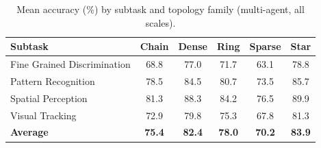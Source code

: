 \begin{table}[htbp]
\centering
\caption{Mean accuracy (\%) by subtask and topology family (multi-agent, all scales).}
\label{tab:accuracy_matrix}
\begin{tabular}{lccccc}
\toprule
Subtask & Chain & Dense & Ring & Sparse & Star \\
\midrule
Fine Grained Discrimination & 68.8 & 77.0 & 71.7 & 63.1 & 78.8 \\
Pattern Recognition & 78.5 & 84.5 & 80.7 & 73.5 & 85.7 \\
Spatial Perception & 81.3 & 88.3 & 84.2 & 76.5 & 89.9 \\
Visual Tracking & 72.9 & 79.8 & 75.3 & 67.8 & 81.3 \\
\midrule
\textbf{Average} & \textbf{75.4} & \textbf{82.4} & \textbf{78.0} & \textbf{70.2} & \textbf{83.9} \\
\bottomrule
\end{tabular}
\end{table}
